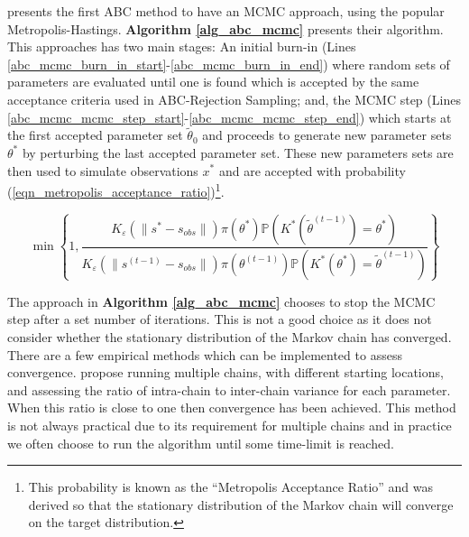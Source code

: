 \documentclass[11pt,a4paper]{article}
\newcommand*{\prob}{\mathbb{P}}
\theoremstyle{break}
\begin{document}
  \par \cite[]{mcmc_wo_likelihood} presents the first ABC method to have an MCMC approach, using the popular Metropolis-Hastings. \textbf{Algorithm \ref{alg_abc_mcmc}} presents their algorithm. This approaches has two main stages: An initial burn-in (Lines \ref{abc_mcmc_burn_in_start}-\ref{abc_mcmc_burn_in_end}) where random sets of parameters are evaluated until one is found which is accepted by the same acceptance criteria used in ABC-Rejection Sampling; and, the MCMC step (Lines \ref{abc_mcmc_mcmc_step_start}-\ref{abc_mcmc_mcmc_step_end}) which starts at the first accepted parameter set $\tilde\theta_0$ and proceeds to generate new parameter sets $\theta^*$ by perturbing the last accepted parameter set. These new parameters sets are then used to simulate observations $x^*$ and are accepted with probability (\ref{eqn_metropolis_acceptance_ratio})\footnote{This probability is known as the ``Metropolis Acceptance Ratio'' and was derived so that the stationary distribution of the Markov chain will converge on the target distribution.}.

  \begin{equation}\label{eqn_metropolis_acceptance_ratio}
    \min\left\{1,\frac{K_\varepsilon(\|s^*-s_{obs}\|)\pi(\theta^*)\prob\left(K^*(\tilde\theta^{(t-1)})=\theta^*\right)}{K_\varepsilon(\|s^{(t-1)}-s_{obs}\|)\pi(\theta^{(t-1)})\prob\left(K^*(\theta^*)=\tilde\theta^{(t-1)}\right)}\right\}
  \end{equation}

  \par The approach in \textbf{Algorithm \ref{alg_abc_mcmc}} chooses to stop the MCMC step after a set number of iterations. This is not a good choice as it does not consider whether the stationary distribution of the Markov chain has converged. There are a few empirical methods which can be implemented to assess convergence. \cite[]{inference_from_iterative_simulation_using_multiple_sequences} propose running multiple chains, with different starting locations, and assessing the ratio of intra-chain to inter-chain variance for each parameter. When this ratio is close to one then convergence has been achieved. This method is not always practical due to its requirement for multiple chains and in practice we often choose to run the algorithm until some time-limit is reached.
\end{document}
